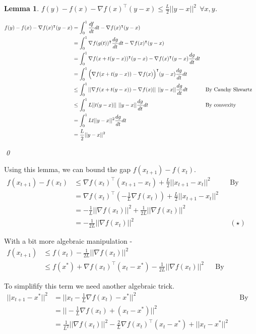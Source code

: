 \documentclass[a4paper]{article}
\newtheorem{lemma}[theorem]{Lemma}
\begin{document}
\begin{lemma} $f(y) - f(x) - \nabla f(x)^\intercal (y - x) \leq \frac{L}{2} ||y - x||^2  \ \  \forall x, y$.

\begin{align*}
    f(y) - f(x) - \nabla f(x)^\intercal (y - x)
    &= \int_0^1 \frac{df}{dt} dt - \nabla f(x)^\intercal (y - x) \\
    &= \int_0^1 \nabla f(g(t))^\intercal \frac{dg}{dt} dt - \nabla f(x)^\intercal (y - x) \\
    &= \int_0^1 \nabla f(x + t (y - x))^\intercal (y - x) - \nabla f(x)^\intercal (y - x) \frac{dg}{dt} dt \\
    &= \int_0^1 \Big(\nabla f(x + t (y - x)) - \nabla f(x) \Big)^\intercal (y - x) \frac{dg}{dt} dt \\
    &\leq \int_0^1 ||\nabla f(x + t (y - x)) - \nabla f(x)||\ ||y - x|| \frac{dg}{dt} dt && \text{\normalfont By Cauchy Shwartz} \\
    &\leq \int_0^1 L ||t (y - x)||\ ||y - x|| \frac{dg}{dt} dt && \text{\normalfont By convexity} \\
    &= \int_0^1 L t ||y - x||^2 \frac{dg}{dt} dt \\
    &= \frac{L}{2} ||y - x||^2
\end{align*}

\qed
\end{lemma}

Using this lemma, we can bound the gap $f(x_{t+1}) - f(x_t)$.
\begin{align*}
    f(x_{t+1}) - f(x_t) &\leq \nabla f(x_t)^\intercal (x_{t+1} - x_t) + \frac{L}{2} ||x_{t+1} - x_t||^2 && \text{By lemma} \\
                        &= \nabla f(x_t)^\intercal (- \frac{1}{L} \nabla f(x_t)) + \frac{L}{2} ||x_{t+1} - x_t||^2 \\
    &= -\frac{1}{L} ||\nabla f(x_t)||^2 + \frac{1}{2L} ||\nabla f(x_t)||^2 \\
    &= -\frac{1}{2L} ||\nabla f(x_t)||^2 && (\star)
\end{align*}

With a bit more algebraic manipulation -
\begin{align*}
    f(x_{t+1}) &\leq f(x_t) - \frac{1}{2L} ||\nabla f(x_t)||^2 \\
               &\leq f(x^*) + \nabla f(x_t)^\intercal (x_t - x^*) - \frac{1}{2L} ||\nabla f(x_t)||^2 && \text{By convexity}
\end{align*}

To simplifify this term we need another algebraic trick.
\begin{align*}
    ||x_{t+1} - x^*||^2
    &= ||x_t - \frac{1}{L} \nabla f(x_t) - x^*||^2 && \text{By gradient step} \\
    &= ||-\frac{1}{L} \nabla f(x_t) + (x_t - x^*)||^2  \\
    &= \frac{1}{L^2} ||\nabla f(x_t)||^2 - \frac{2}{L} \nabla f(x_t)^\intercal (x_t - x^*) + ||x_t - x^*||^2
\end{align*}
\end{document}
